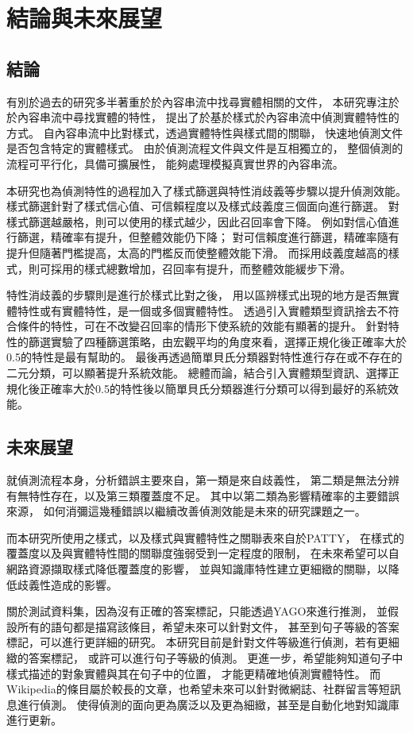 %
%
%
\chapter{結論與未來展望}
\label{c:future}

\section{結論}
有別於過去的研究多半著重於於內容串流中找尋實體相關的文件，
本研究專注於於內容串流中尋找實體的特性，
提出了於基於樣式於內容串流中偵測實體特性的方式。
自內容串流中比對樣式，透過實體特性與樣式間的關聯，
快速地偵測文件是否包含特定的實體樣式。
由於偵測流程文件與文件是互相獨立的，
整個偵測的流程可平行化，具備可擴展性，
能夠處理模擬真實世界的內容串流。

本研究也為偵測特性的過程加入了樣式篩選與特性消歧義等步驟以提升偵測效能。
樣式篩選針對了樣式信心值、可信賴程度以及樣式歧義度三個面向進行篩選。
對樣式篩選越嚴格，則可以使用的樣式越少，因此召回率會下降。
例如對信心值進行篩選，精確率有提升，但整體效能仍下降；
對可信賴度進行篩選，精確率隨有提升但隨著門檻提高，太高的門檻反而使整體效能下滑。
而採用歧義度越高的樣式，則可採用的樣式總數增加，召回率有提升，而整體效能緩步下滑。

特性消歧義的步驟則是進行於樣式比對之後，
用以區辨樣式出現的地方是否無實體特性或有實體特性，是一個或多個實體特性。
透過引入實體類型資訊捨去不符合條件的特性，可在不改變召回率的情形下使系統的效能有顯著的提升。
針對特性的篩選實驗了四種篩選策略，由宏觀平均的角度來看，選擇正規化後正確率大於0.5的特性是最有幫助的。
最後再透過簡單貝氏分類器對特性進行存在或不存在的二元分類，可以顯著提升系統效能。
總體而論，結合引入實體類型資訊、選擇正規化後正確率大於0.5的特性後以簡單貝氏分類器進行分類可以得到最好的系統效能。

\section{未來展望}
就偵測流程本身，分析錯誤主要來自，第一類是來自歧義性，
第二類是無法分辨有無特性存在，以及第三類覆蓋度不足。
其中以第二類為影響精確率的主要錯誤來源，
如何消彌這幾種錯誤以繼續改善偵測效能是未來的研究課題之一。

而本研究所使用之樣式，以及樣式與實體特性之關聯表來自於PATTY，
在樣式的覆蓋度以及與實體特性間的關聯度強弱受到一定程度的限制，
在未來希望可以自網路資源擷取樣式降低覆蓋度的影響，
並與知識庫特性建立更細緻的關聯，以降低歧義性造成的影響。

關於測試資料集，因為沒有正確的答案標記，只能透過YAGO來進行推測，
並假設所有的語句都是描寫該條目，希望未來可以針對文件，
甚至到句子等級的答案標記，可以進行更詳細的研究。
本研究目前是針對文件等級進行偵測，若有更細緻的答案標記，
或許可以進行句子等級的偵測。
更進一步，希望能夠知道句子中樣式描述的對象實體與其在句子中的位置，
才能更精確地偵測實體特性。
而Wikipedia的條目屬於較長的文章，也希望未來可以針對微網誌、社群留言等短訊息進行偵測。
使得偵測的面向更為廣泛以及更為細緻，甚至是自動化地對知識庫進行更新。

